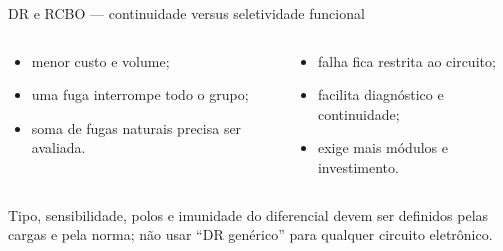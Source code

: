 \begin{frame}{DR e RCBO — continuidade versus seletividade funcional}
\scriptsize
\begin{columns}[T,onlytextwidth]
\begin{caixaProjeto}[title=Um DR para vários circuitos]
\begin{itemize}
\item menor custo e volume;
\item uma fuga interrompe todo o grupo;
\item soma de fugas naturais precisa ser avaliada.
\end{itemize}
\end{caixaProjeto}
\begin{caixaProjeto}[title=RCBO por circuito]
\begin{itemize}
\item falha fica restrita ao circuito;
\item facilita diagnóstico e continuidade;
\item exige mais módulos e investimento.
\end{itemize}
\end{caixaProjeto}
\end{columns}
\begin{caixaAt}
Tipo, sensibilidade, polos e imunidade do diferencial devem ser definidos pelas cargas e pela norma; não usar “DR genérico” para qualquer circuito eletrônico.
\end{caixaAt}
\end{frame}

